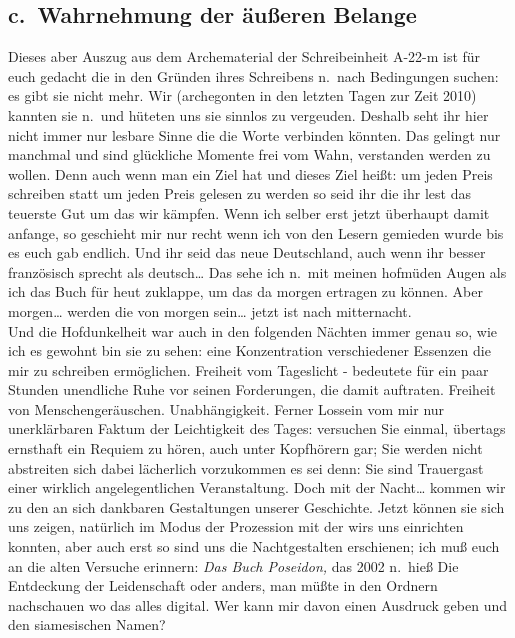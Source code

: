 \documentclass[
]{article}
\author{}
\date{\vspace{-2.5em}}
\begin{document}
\subsection{c.~Wahrnehmung der äußeren
Belange}\label{c.-wahrnehmung-der-uxe4uuxdferen-belange}

Dieses aber Auszug aus dem Archematerial der Schreibeinheit A-22-m ist
für euch gedacht die in den Gründen ihres Schreibens n.~nach Bedingungen
suchen: es gibt sie nicht mehr. Wir (archegonten in den letzten Tagen
zur Zeit 2010) kannten sie n.~und hüteten uns sie sinnlos zu vergeuden.
Deshalb seht ihr hier nicht immer nur lesbare Sinne die die Worte
verbinden könnten. Das gelingt nur manchmal und sind glückliche Momente
frei vom Wahn, verstanden werden zu wollen. Denn auch wenn man ein Ziel
hat und dieses Ziel heißt: um jeden Preis schreiben statt um jeden Preis
gelesen zu werden so seid ihr die ihr lest das teuerste Gut um das wir
kämpfen. Wenn ich selber erst jetzt überhaupt damit anfange, so
geschieht mir nur recht wenn ich von den Lesern gemieden wurde bis es
euch gab endlich. Und ihr seid das neue Deutschland, auch wenn ihr
besser französisch sprecht als deutsch\ldots{} Das sehe ich n.~mit
meinen hofmüden Augen als ich das Buch für heut zuklappe, um das da
morgen ertragen zu können. Aber morgen\ldots{} werden die von morgen
sein\ldots{} jetzt ist nach mitternacht.\\
Und die Hofdunkelheit war auch in den folgenden Nächten immer genau so,
wie ich es gewohnt bin sie zu sehen: eine Konzentration verschiedener
Essenzen die mir zu schreiben ermöglichen. Freiheit vom Tageslicht -
bedeutete für ein paar Stunden unendliche Ruhe vor seinen Forderungen,
die damit auftraten. Freiheit von Menschengeräuschen. Unabhängigkeit.
Ferner Lossein vom mir nur unerklärbaren Faktum der Leichtigkeit des
Tages: versuchen Sie einmal, übertags ernsthaft ein Requiem zu hören,
auch unter Kopfhörern gar; Sie werden nicht abstreiten sich dabei
lächerlich vorzukommen es sei denn: Sie sind Trauergast einer wirklich
angelegentlichen Veranstaltung. Doch mit der Nacht\ldots{} kommen wir zu
den an sich dankbaren Gestaltungen unserer Geschichte. Jetzt können sie
sich uns zeigen, natürlich im Modus der Prozession mit der wirs uns
einrichten konnten, aber auch erst so sind uns die Nachtgestalten
erschienen; ich muß euch an die alten Versuche erinnern: \emph{Das Buch
Poseidon, }das 2002 n.~hieß Die Entdeckung der Leidenschaft oder anders,
man müßte in den Ordnern nachschauen wo das alles digital. Wer kann mir
davon einen Ausdruck geben und den siamesischen Namen?
\end{document}
